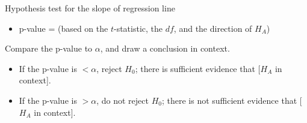 \begin{onebox}{Hypothesis test for the slope of regression line}
\begin{itemize}
\begin{itemize}
\end{itemize}
\item[] p-value = (based on the $t$-statistic, the $df$, and the direction of $H_A$)
\end{itemize}
  Compare the p-value to $\alpha$, and draw a conclusion in context. \vspace{-1mm}
\begin{itemize}
\item[] If the p-value is $< \alpha$, reject $H_0$; there is sufficient evidence that [$H_A$ in context]. 
\item[] If the p-value is $> \alpha$, do not reject $H_0$; there is not sufficient evidence that [$H_A$ in context].
\end{itemize}\end{onebox}


